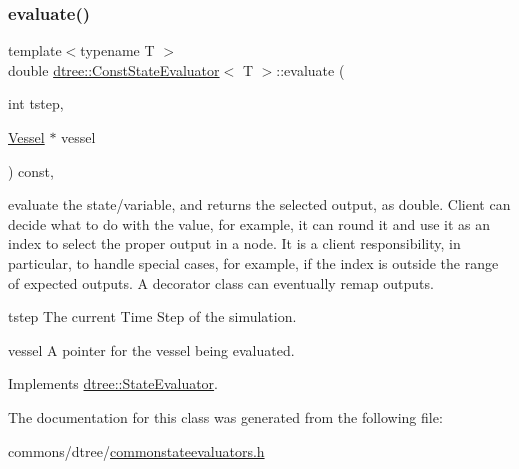 \subsubsection{\texorpdfstring{evaluate()}{evaluate()}}
{\footnotesize\ttfamily template$<$typename T $>$ \\
double \mbox{\hyperlink{classdtree_1_1_const_state_evaluator}{dtree\+::\+Const\+State\+Evaluator}}$<$ T $>$\+::evaluate (\begin{DoxyParamCaption}\item[{int}]{tstep,  }\item[{\mbox{\hyperlink{class_vessel}{Vessel}} $\ast$}]{vessel }\end{DoxyParamCaption}) const\hspace{0.3cm}{\ttfamily [inline]}, {\ttfamily [virtual]}}



evaluate the state/variable, and returns the selected output, as double. Client can decide what to do with the value, for example, it can round it and use it as an index to select the proper output in a node. It is a client responsibility, in particular, to handle special cases, for example, if the index is outside the range of expected outputs. A decorator class can eventually remap outputs. 

\begin{DoxyItemize}
\item tstep The current Time Step of the simulation. \item vessel A pointer for the vessel being evaluated. \end{DoxyItemize}


Implements \mbox{\hyperlink{classdtree_1_1_state_evaluator_ab57666219fbdc728f40d9d5acd5726cb}{dtree\+::\+State\+Evaluator}}.



The documentation for this class was generated from the following file\+:\begin{DoxyCompactItemize}
\item 
commons/dtree/\mbox{\hyperlink{commonstateevaluators_8h}{commonstateevaluators.\+h}}\end{DoxyCompactItemize}
